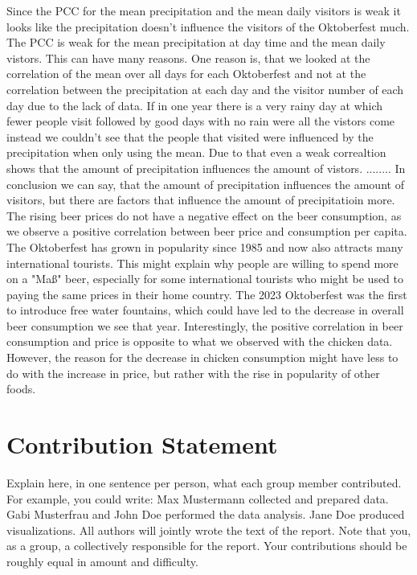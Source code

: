 \documentclass{article}
\theoremstyle{plain}
\theoremstyle{definition}
\theoremstyle{remark}
\begin{document}
Since the PCC for the mean precipitation and the mean daily visitors is weak it looks like the precipitation doesn't influence the visitors of the Oktoberfest much.
The PCC is weak for the mean precipitation at day time and the mean daily vistors. This can have many reasons. One reason is, that we looked at the correlation of the mean over all days for each Oktoberfest and not at the correlation between the precipitation at each day and the visitor number of each day due to the lack of data. If in one year there is a very rainy day at which fewer people visit followed by good days with no rain were all the vistors come instead we couldn't see that the people that visited were influenced by the precipitation when only using the mean. Due to that even a weak correaltion shows that the amount of precipitation influences the amount of vistors. ........ In conclusion we can say, that the amount of precipitation influences the amount of visitors, but there are factors that influence the amount of precipitatioin more.\\

The rising beer prices do not have a negative effect on the beer consumption, as we observe a positive correlation between beer price and consumption per capita. The Oktoberfest has grown in popularity since 1985 and now also attracts many international tourists. This might explain why people are willing to spend more on a "Maß" beer, especially for some international tourists who might be used to paying the same prices in their home country. The 2023 Oktoberfest was the first to introduce free water fountains, which could have led to the decrease in overall beer consumption we see that year. Interestingly, the positive correlation in beer consumption and price is opposite to what we observed with the chicken data. However, the reason for the decrease in chicken consumption might have less to do with the increase in price, but rather with the rise in popularity of other foods.

\section*{Contribution Statement}

Explain here, in one sentence per person, what each group member contributed. For example, you could write: Max Mustermann collected and prepared data. Gabi Musterfrau and John Doe performed the data analysis. Jane Doe produced visualizations. All authors will jointly wrote the text of the report. Note that you, as a group, a collectively responsible for the report. Your contributions should be roughly equal in amount and difficulty.
\end{document}
